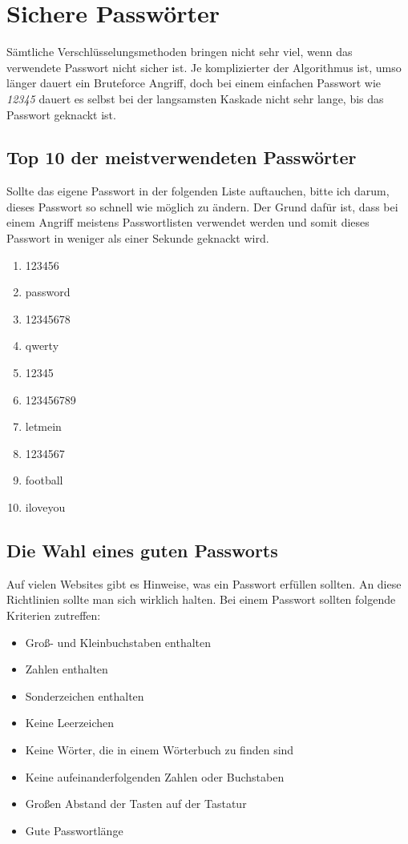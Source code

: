 \documentclass[12pt,a4paper]{scrreprt}
\begin{document}
\section{Sichere Passwörter}
Sämtliche Verschlüsselungsmethoden bringen nicht sehr viel, wenn das verwendete Passwort nicht sicher ist. Je komplizierter der Algorithmus ist, umso länger dauert ein Bruteforce Angriff, doch bei einem einfachen Passwort wie \textit{12345} dauert es selbst bei der langsamsten Kaskade nicht sehr lange, bis das Passwort geknackt ist.
\subsection{Top 10 der meistverwendeten Passwörter}
Sollte das eigene Passwort in der folgenden Liste auftauchen, bitte ich darum, dieses Passwort so schnell wie möglich zu ändern. Der Grund dafür ist, dass bei einem Angriff meistens Passwortlisten verwendet werden und somit dieses Passwort in weniger als einer Sekunde geknackt wird.

\begin{enumerate}
\item 123456
\item password
\item 12345678
\item qwerty
\item 12345
\item 123456789
\item letmein
\item 1234567
\item football
\item iloveyou
\end{enumerate}

\subsection{Die Wahl eines guten Passworts}
Auf vielen Websites gibt es Hinweise, was ein Passwort erfüllen sollten. An diese Richtlinien sollte man sich wirklich halten. Bei einem Passwort sollten folgende Kriterien zutreffen:\\

\begin{itemize}
\item Groß- und Kleinbuchstaben enthalten
\item Zahlen enthalten
\item Sonderzeichen enthalten
\item Keine Leerzeichen
\item Keine Wörter, die in einem Wörterbuch zu finden sind
\item Keine aufeinanderfolgenden Zahlen oder Buchstaben
\item Großen Abstand der Tasten auf der Tastatur
\item Gute Passwortlänge
\end{itemize}
\end{document}
